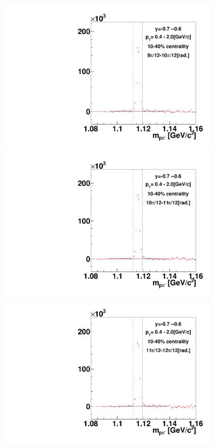 \begin{figure}[h]
\includegraphics[width=0.14\linewidth]{chapterX/fig/ld_v1_sig/kf_ptslice0_cent1_ld_flow_phi10_rap11.pdf}
\includegraphics[width=0.14\linewidth]{chapterX/fig/ld_v1_sig/kf_ptslice0_cent1_ld_flow_phi11_rap11.pdf}
\includegraphics[width=0.14\linewidth]{chapterX/fig/ld_v1_sig/kf_ptslice0_cent1_ld_flow_phi12_rap11.pdf}


\end{figure}
